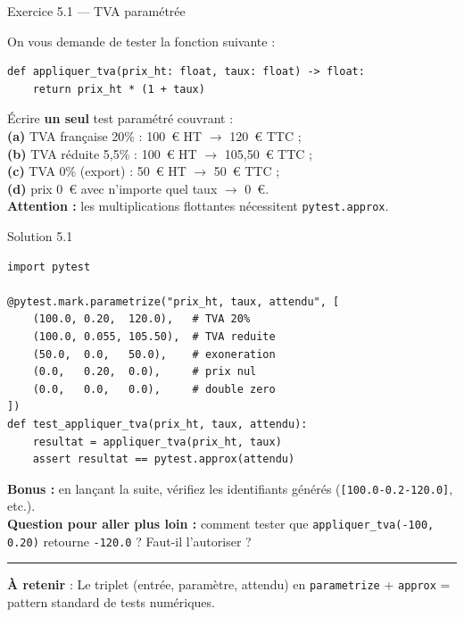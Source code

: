 \documentclass[aspectratio=169,11pt]{beamer}
\newcommand{\takeaway}[1]{%
\vfill\begin{beamercolorbox}[wd=\linewidth,sep=0.4em]{}
\color{accent2}\rule[0.6ex]{1.2em}{1.2pt}\hspace{0.4em}%
\textbf{\color{accent2}\small À retenir} \textcolor{textsoft}{:} %
{\small\color{textmain}#1}
\end{beamercolorbox}}
\begin{document}
\begin{frame}[fragile,t]{Exercice 5.1 --- TVA paramétrée}
\begin{exercice}
On vous demande de tester la fonction suivante :
\begin{lstlisting}[style=pythondark]
def appliquer_tva(prix_ht: float, taux: float) -> float:
    return prix_ht * (1 + taux)
\end{lstlisting}
\vspace{0.3em}
Écrire \textbf{un seul} test paramétré couvrant :\\[0.2em]
\textbf{(a)} TVA française 20\% : 100~\euro{} HT $\to$ 120~\euro{} TTC ;\\
\textbf{(b)} TVA réduite 5{,}5\% : 100~\euro{} HT $\to$ 105{,}50~\euro{} TTC ;\\
\textbf{(c)} TVA 0\% (export) : 50~\euro{} HT $\to$ 50~\euro{} TTC ;\\
\textbf{(d)} prix 0~\euro{} avec n'importe quel taux $\to$ 0~\euro{}.\\[0.3em]
\textbf{Attention :} les multiplications flottantes nécessitent \texttt{pytest.approx}.
\end{exercice}
\end{frame}

\begin{frame}[fragile,t,shrink=10]{Solution 5.1}
\begin{lstlisting}[style=pythondark]
import pytest

@pytest.mark.parametrize("prix_ht, taux, attendu", [
    (100.0, 0.20,  120.0),   # TVA 20%
    (100.0, 0.055, 105.50),  # TVA reduite
    (50.0,  0.0,   50.0),    # exoneration
    (0.0,   0.20,  0.0),     # prix nul
    (0.0,   0.0,   0.0),     # double zero
])
def test_appliquer_tva(prix_ht, taux, attendu):
    resultat = appliquer_tva(prix_ht, taux)
    assert resultat == pytest.approx(attendu)
\end{lstlisting}
\vspace{0.3cm}
\footnotesize \textbf{Bonus :} en lançant la suite, vérifiez les identifiants générés (\texttt{[100.0-0.2-120.0]}, etc.).\\
\textbf{Question pour aller plus loin :} comment tester que \texttt{appliquer\_tva(-100, 0.20)} retourne \texttt{-120.0} ? Faut-il l'autoriser ?
\takeaway{Le triplet (entrée, paramètre, attendu) en \texttt{parametrize} + \texttt{approx} = pattern standard de tests numériques.}
\end{frame}
\end{document}
